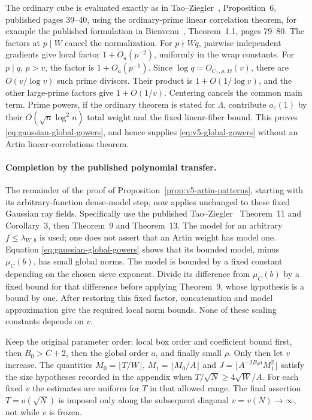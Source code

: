 \documentclass[11pt]{article}
\theoremstyle{definition}
\theoremstyle{remark}
\begin{document}
The ordinary cube is evaluated exactly as in Tao--Ziegler~\cite{v5tz},
Proposition~6, published pages 39--40, using the ordinary-prime linear
correlation theorem, for example the published formulation in
Bienvenu~\cite{v6bienvenu}, Theorem~1.1, pages 79--80.
The factors at $p\mid W$ cancel the normalization.
For $p\nmid Wq$, pairwise independent gradients give local factor
$1+O_a(p^{-2})$, uniformly in the wrap constants. For $p\mid q$,
$p>v$, the factor is $1+O_a(p^{-1})$. Since
$\log q=O_{C_1,\rho,D}(v)$, there are $O(v/\log v)$ such prime divisors.
Their product is $1+O(1/\log v)$, and the other large-prime factors
give $1+O(1/v)$. Centering cancels the common main term. Prime powers,
if the ordinary theorem is stated for $\Lambda$, contribute $o_v(1)$
by their $O(\sqrt n\log^2 n)$ total weight and the fixed linear-fiber
bound. This proves \eqref{eq:gaussian-global-gowers}, and hence supplies
\eqref{eq:v5-global-gowers} without an Artin linear-correlations theorem.

\paragraph{Completion by the published polynomial transfer.}
The remainder of the proof of Proposition~\ref{prop:v5-artin-patterns},
starting with its arbitrary-function dense-model step, now applies
unchanged to these fixed Gaussian ray fields. Specifically use the
published Tao--Ziegler~\cite{v5tz} Theorem~11 and Corollary~3, then Theorem~9 and
Theorem~13. The model for an arbitrary $f\leq\lambda_{W,b}$ is used;
one does not assert that an Artin weight has model one. Equation
\eqref{eq:gaussian-global-gowers} shows that its bounded model, minus
$\mu_C(b)$, has small global norms. The model is bounded by a fixed
constant depending on the chosen sieve exponent. Divide its difference
from $\mu_C(b)$ by a fixed bound for that difference before applying
Theorem~9, whose hypothesis is a bound by one. After restoring this
fixed factor, concatenation and model approximation give the required
local norm bounds. None of these scaling constants depends on $v$.

Keep the original parameter order: local box order and coefficient
bound first, then $B_0>C+2$, then the global order $a$, and finally
small $\rho$. Only then let $v$ increase. The quantities
$M_0=\lfloor T/W\rfloor$, $M_1=\lfloor M_0/A\rfloor$ and
$J=\lfloor A^{-2B_0a}M_1^2\rfloor$ satisfy the size hypotheses recorded
in the appendix when $T/\sqrt N\geq4\sqrt W/A$.
For each fixed $v$ the estimates are uniform for $T$ in that allowed
range. The final assertion $T=o(\sqrt N)$ is imposed only along the
subsequent diagonal $v=v(N)\to\infty$, not while $v$ is frozen.
\end{document}
